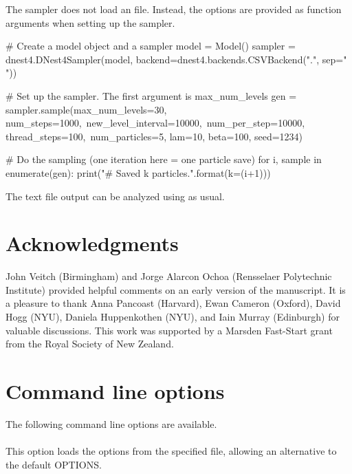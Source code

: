 \documentclass[article]{jss}
\begin{document}
The  sampler does not load an  file.
Instead, the options are provided as function arguments
when setting up the sampler.
%
\begin{CodeChunk}
\begin{CodeInput}
# Create a model object and a sampler
model = Model()
sampler = dnest4.DNest4Sampler(model,
                               backend=dnest4.backends.CSVBackend(".",
                                                                  sep=" "))

# Set up the sampler. The first argument is max_num_levels
gen = sampler.sample(max_num_levels=30, num_steps=1000,\
                      new_level_interval=10000,\
                      num_per_step=10000, thread_steps=100,\
                      num_particles=5, lam=10, beta=100, seed=1234)

# Do the sampling (one iteration here = one particle save)
for i, sample in enumerate(gen):
    print("# Saved {k} particles.".format(k=(i+1)))
\end{CodeInput}
\end{CodeChunk}
%
The text file output can be analyzed using 
as usual.

\section*{Acknowledgments}
John Veitch (Birmingham)
and Jorge Alarcon Ochoa (Rensselaer Polytechnic Institute)
provided helpful comments on an early
version of the manuscript.
It is a pleasure to thank Anna Pancoast (Harvard),
Ewan Cameron (Oxford), David Hogg (NYU), Daniela Huppenkothen (NYU),
and Iain Murray (Edinburgh)
for valuable discussions. This work was supported by a Marsden Fast-Start grant
from the Royal Society of New Zealand.



\newpage
\appendix
\section{Command line options}\label{sec:command_line_options}
The following command line options are available.\\

\code{-o <filename>}\\
This option loads the \pkg{DNest4} options from the specified file, allowing
an alternative to the default OPTIONS.\\
\end{document}
